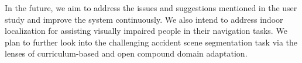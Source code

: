 \documentclass[journal]{IEEEtran}
\begin{document}
In the future, we aim to address the issues and suggestions mentioned in the user study and improve the system continuously.
We also intend to address indoor localization for assisting visually impaired people in their navigation tasks. We plan to further look into the challenging accident scene segmentation task via the lenses of curriculum-based and open compound domain adaptation.



\end{document}

